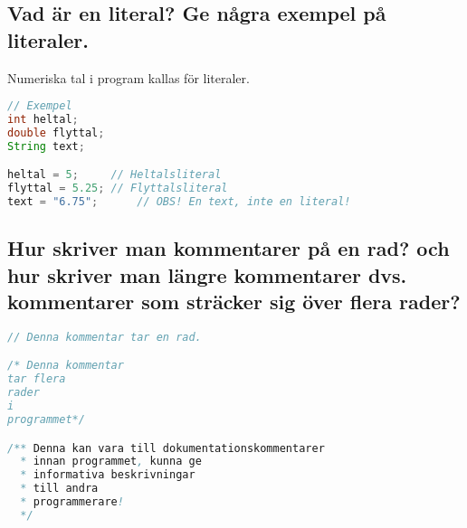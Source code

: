 \documentclass[../main.tex]{subfiles}
\begin{document}
\subsection{Vad är en literal? Ge några exempel på literaler.}
Numeriska tal i program kallas för literaler. 
\begin{lstlisting}[language=java]
// Exempel
int heltal;
double flyttal;
String text;

heltal = 5;     // Heltalsliteral
flyttal = 5.25; // Flyttalsliteral
text = "6.75";      // OBS! En text, inte en literal!
\end{lstlisting}

\subsection{Hur skriver man kommentarer på en rad? och hur skriver man längre kommentarer dvs. kommentarer som sträcker sig över flera rader?}
\begin{lstlisting}[language=java]
// Denna kommentar tar en rad.

/* Denna kommentar
tar flera
rader 
i
programmet*/

/** Denna kan vara till dokumentationskommentarer
  * innan programmet, kunna ge
  * informativa beskrivningar
  * till andra 
  * programmerare!
  */
\end{lstlisting}
\end{document}
